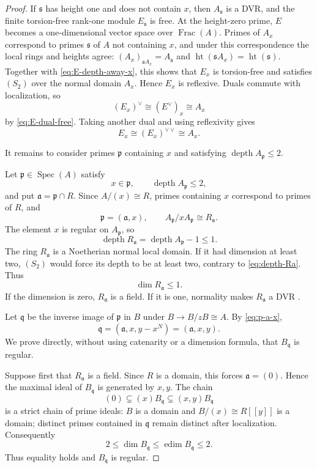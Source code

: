 \documentclass[reqno]{amsart}
\theoremstyle{plain}
\theoremstyle{definition}
\newcommand{\Spec}{\operatorname{Spec}}
\newcommand{\depth}{\operatorname{depth}}
\newcommand{\Frac}{\operatorname{Frac}}
\newcommand{\htp}{\operatorname{ht}}
\begin{document}
\begin{proof}
If $\mathfrak s$ has height one and does not contain $x$, then
$A_{\mathfrak s}$ is a DVR, and the finite torsion-free rank-one module
$E_{\mathfrak s}$ is free.  At the height-zero prime, $E$ becomes a
one-dimensional vector space over $\Frac(A)$.  Primes of $A_x$ correspond
to primes $\mathfrak s$ of $A$ not containing $x$, and under this
correspondence the local rings and heights agree:
$(A_x)_{\mathfrak sA_x}=A_{\mathfrak s}$ and
$\htp(\mathfrak sA_x)=\htp(\mathfrak s)$.  Together with
\eqref{eq:E-depth-away-x}, this shows that $E_x$ is torsion-free and
satisfies $(S_2)$ over the normal domain $A_x$.  Hence $E_x$ is
reflexive.  Duals commute with localization, so
\[
 (E_x)^\vee\cong(E^\vee)_x\cong A_x
\]
by \eqref{eq:E-dual-free}.  Taking another dual and using reflexivity gives
\begin{equation}
\label{eq:E-free-away-x}
 E_x\cong(E_x)^{\vee\vee}\cong A_x.
\end{equation}

It remains to consider primes $\mathfrak p$ containing $x$ and satisfying
$\depth A_{\mathfrak p}\leq2$.

Let $\mathfrak p\in\Spec(A)$ satisfy
\[
 x\in\mathfrak p,
 \qquad \depth A_{\mathfrak p}\leq2,
\]
and put $\mathfrak a=\mathfrak p\cap R$.  Since $A/(x)\cong R$, primes
containing $x$ correspond to primes of $R$, and
\begin{equation}
\label{eq:p-a-x}
 \mathfrak p=(\mathfrak a,x),
 \qquad
 A_{\mathfrak p}/xA_{\mathfrak p}\cong R_{\mathfrak a}.
\end{equation}
The element $x$ is regular on $A_{\mathfrak p}$, so
\begin{equation}
\label{eq:depth-Ra}
 \depth R_{\mathfrak a}
 =\depth A_{\mathfrak p}-1\leq1.
\end{equation}
The ring $R_{\mathfrak a}$ is a Noetherian normal local domain.  If it had
dimension at least two, $(S_2)$ would force its depth to be at least two,
contrary to \eqref{eq:depth-Ra}.  Thus
\[
 \dim R_{\mathfrak a}\leq1.
\]
If the dimension is zero, $R_{\mathfrak a}$ is a field.  If it is one,
normality makes $R_{\mathfrak a}$ a DVR
\cite[Proposition~9.2]{AtiyahMacdonald}.

Let $\mathfrak q$ be the inverse image of $\mathfrak p$ in $B$ under
$B\to B/zB\cong A$.  By \eqref{eq:p-a-x},
\[
 \mathfrak q=(\mathfrak a,x,y-x^N)
             =(\mathfrak a,x,y).
\]
We prove directly, without using catenarity or a dimension formula, that
$B_{\mathfrak q}$ is regular.

Suppose first that $R_{\mathfrak a}$ is a field.  Since $R$ is a domain,
this forces $\mathfrak a=(0)$.  Hence the maximal ideal of
$B_{\mathfrak q}$ is generated by $x,y$.  The chain
\[
 (0)\subsetneq(x)B_{\mathfrak q}
 \subsetneq(x,y)B_{\mathfrak q}
\]
is a strict chain of prime ideals: $B$ is a domain and
$B/(x)\cong R[[y]]$ is a domain; distinct primes contained in
$\mathfrak q$ remain distinct after localization.  Consequently
\[
 2\leq\dim B_{\mathfrak q}
 \leq\operatorname{edim}B_{\mathfrak q}\leq2.
\]
Thus equality holds and $B_{\mathfrak q}$ is regular.


\end{proof}
\end{document}
